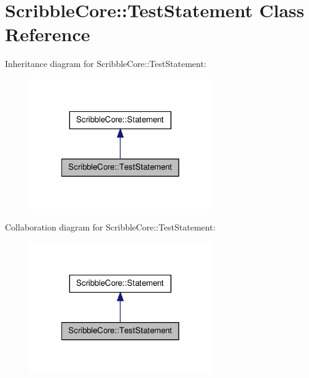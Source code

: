 \hypertarget{class_scribble_core_1_1_test_statement}{\section{Scribble\-Core\-:\-:Test\-Statement Class Reference}
\label{class_scribble_core_1_1_test_statement}
}


Inheritance diagram for Scribble\-Core\-:\-:Test\-Statement\-:
\nopagebreak
\begin{figure}[H]
\begin{center}
\leavevmode
\includegraphics[width=222pt]{class_scribble_core_1_1_test_statement__inherit__graph}
\end{center}
\end{figure}


Collaboration diagram for Scribble\-Core\-:\-:Test\-Statement\-:
\nopagebreak
\begin{figure}[H]
\begin{center}
\leavevmode
\includegraphics[width=222pt]{class_scribble_core_1_1_test_statement__coll__graph}
\end{center}
\end{figure}
